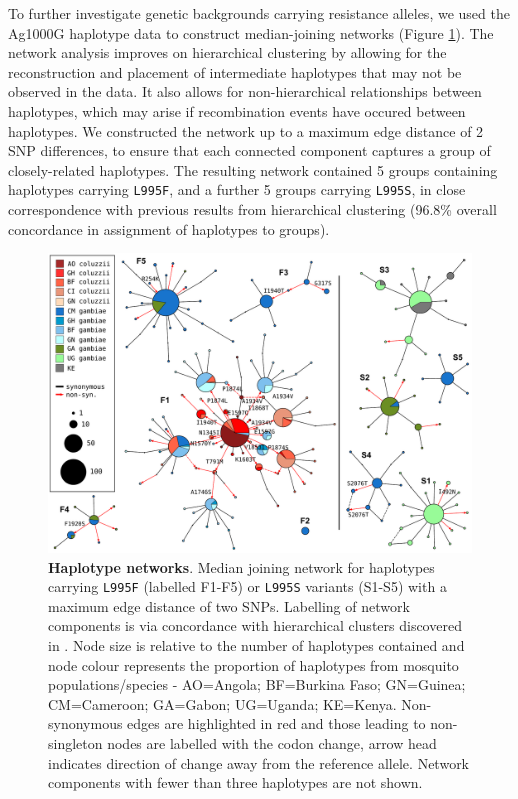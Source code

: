 \documentclass[a4paper,11pt,abstracton,hidelinks]{scrartcl}
\begin{document}
%
To further investigate genetic backgrounds carrying resistance alleles, we used the Ag1000G haplotype data to construct median-joining networks \cite{Bandelt1999} (Figure \ref{fig:networks}).
%
The network analysis improves on hierarchical clustering by allowing for the reconstruction and placement of intermediate haplotypes that may not be observed in the data.
%
It also allows for non-hierarchical relationships between haplotypes, which may arise if recombination events have occured between haplotypes.
%
We constructed the network up to a maximum edge distance of 2 SNP differences, to ensure that each connected component captures a group of closely-related haplotypes.
%
The resulting network contained 5 groups containing haplotypes carrying \texttt{L995F}, and a further 5 groups carrying \texttt{L995S}, in close correspondence with previous results from hierarchical clustering (96.8\% overall concordance in assignment of haplotypes to groups).
%


%
\begin{figure}[!t]
  \includegraphics[width=1.1\linewidth,center]{artwork/figure_Phase_2_median_joining_network_label_pruned.pdf}
  \caption{\textbf{Haplotype networks}. Median joining network for haplotypes carrying \texttt{L995F} (labelled F1-F5) or \texttt{L995S} variants (S1-S5) with a maximum edge distance of two SNPs. Labelling of network components is via concordance with hierarchical clusters discovered in \cite{Ag1000gConsortium2017}. Node size is relative to the number of haplotypes contained and node colour represents the proportion of haplotypes from mosquito populations/species - AO=Angola; BF=Burkina Faso; GN=Guinea; CM=Cameroon; GA=Gabon; UG=Uganda; KE=Kenya. Non-synonymous edges are highlighted in red and those leading to non-singleton nodes are labelled with the codon change, arrow head indicates direction of change away from the reference allele. Network components with fewer than three haplotypes are not shown.}
  \label{fig:networks}
\end{figure}
\end{document}
